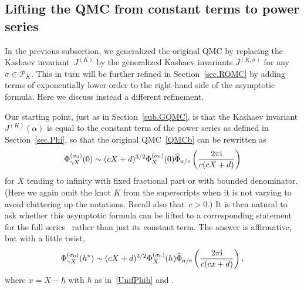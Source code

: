 \documentclass[pdftex]{sigma}
\numberwithin{equation}{section}
\def\calP{\mathcal P}
\def\calP{\mathcal P}
\def\Phih{\widehat\Phi}
\def\a{\alpha}
\def\a{\alpha}
\def\s{\sigma}
\def\be{\begin{equation}}
\def\ee{\end{equation}}
\def\g{\gamma}
\begin{document}
\subsection{Lifting the QMC from constant terms to power series}
\label{sub.QMCwithh}

In the previous subsection, we generalized the original QMC by replacing the Kashaev
invariant~$J^{(K)}$ by the generalized Kashaev invariants $J^{(K,\s)}$ for any
$\s\in\calP_K$. This in turn will be further refined in Section~\ref{sec.RQMC} by
adding terms of exponentially lower order to the right-hand side of the asymptotic
formula. Here we discuss instead a different refinement.

Our starting point, just as in Section~\ref{sub.GQMC}, is that the
Kashaev invariant $J^{(K)}(\a)$ is equal to the constant term \smash{$\Phi_\a^{(\s_0)}(0)$} of
the power series \smash{$\Phi_\a^{(\s_0)}(h)$} as defined in Section~\ref{sec.Phi}, so that the
original QMC~\eqref{QMCb} can be rewritten as
\[
\Phi_{\g X} ^{(\s_0)}(0)
 \sim  (cX+d)^{3/2} \Phi_{X} ^{(\s_0)}(0)
 \Phih_{a/c}\left(\frac{2\pi {\rm i}}{c(cX+d)}\right)
\]
for $X$ tending to infinity with fixed fractional part or with bounded denominator.
(Here we again omit the knot $K$ from the superscripts when it is not varying to
avoid cluttering up the notations. Recall also that~$c>0$.) It is then natural to ask
whether this asymptotic formula can be lifted to a corresponding statement
for the full series~\smash{$\Phi_\a^{(\s_0)}(h)$} rather than just its constant term.
The answer is affirmative, but with a little twist,
\be
\label{GQMCh}
\Phi_{\g X} ^{(\s_0)}(h^*)  \sim (cX+d)^{3/2}
\Phi_{X} ^{(\s_0)}(h) \Phih_{a/c}\left(\frac{2\pi {\rm i}}{c(cx+d)}\right) ,
\ee
where $x=X-\hbar$ with $\hbar$ as in~\eqref{UnifPhih} and .
\end{document}
